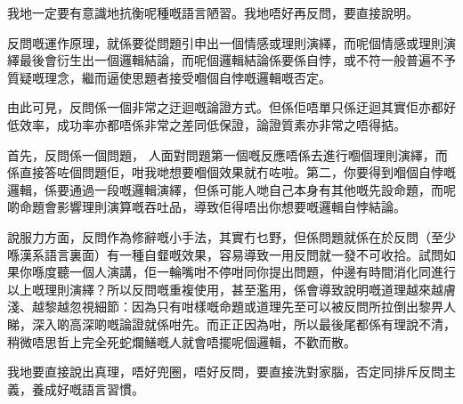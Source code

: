 我地一定要有意識地抗衡呢種嘅語言陋習。我地唔好再反問，要直接說明。

反問嘅運作原理，就係要從問題引申出一個情感或理則演繹，而呢個情感或理則演繹最後會衍生出一個邏輯結論，而呢個邏輯結論係要係自悖，或不符一般普遍不予質疑嘅理念，繼而逼使思題者接受嗰個自悖嘅邏輯嘅否定。

由此可見，反問係一個非常之迂迴嘅論證方式。但係佢唔單只係迂迴其實佢亦都好低效率，成功率亦都唔係非常之差同低保證，論證質素亦非常之唔得掂。

首先，反問係一個問題， 人面對問題第一個嘅反應唔係去進行嗰個理則演繹，而係直接答咗個問題佢，咁我哋想要嗰個效果就冇咗啦。第二，你要得到嗰個自悖嘅邏輯，係要通過一段嘅邏輯演繹，但係可能人哋自己本身有其他嘅先設命題，而呢啲命題會影響理則演算嘅吞吐品，導致佢得唔出你想要嘅邏輯自悖結論。

說服力方面，反問作為修辭嘅小手法，其實冇乜野，但係問題就係在於反問（至少喺漢系語言裏面）有一種自韰嘅效果，容易導致一用反問就一發不可收拾。試問如果你喺度聽一個人演講，佢一輪嘴咁不停咁同你提出問題，仲邊有時間消化同進行以上嘅理則演繹？所以反問嘅重複使用，甚至濫用，係會導致說明嘅道理越來越膚淺、越黎越忽視細節：因為只有咁樣嘅命題或道理先至可以被反問所拉倒出黎畀人睇，深入啲高深啲嘅論證就係咁先。而正正因為咁，所以最後尾都係有理說不清，稍微唔思哲上完全死蛇爛鱔嘅人就會唔擺呢個邏輯，不歡而散。

我地要直接說出真理，唔好兜圈，唔好反問，要直接洗對家腦，否定同排斥反問主義，養成好嘅語言習慣。
